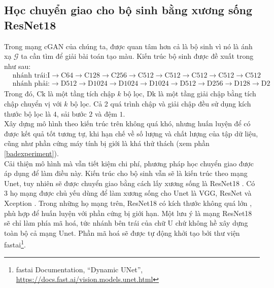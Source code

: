\documentclass[a4paper, 12pt]{article}
\begin{document}
\subsection{Học chuyển giao cho bộ sinh bằng xương sống ResNet18}\label{transferlearning}
Trong mạng cGAN của chúng ta, được quan tâm hơn cả là bộ sinh vì nó là ánh xạ $\mathcal{G}$ ta cần tìm để giải bài toán tạo màu. Kiến trúc bộ sinh được đề xuất trong \cite{isola2018imagetoimage} như sau:
\begin{align*}
    &\text{nhánh trái:} \text{I} \rightarrow \text{C64} \rightarrow \text{C128} \rightarrow \text{C256} \rightarrow \text{C512} \rightarrow \text{C512} \rightarrow \text{C512} \rightarrow \text{C512} \rightarrow \text{C512}\\
    &\text{nhánh phải:} \rightarrow \text{D512} \rightarrow \text{D1024} \rightarrow \text{D1024} \rightarrow \text{D1024} \rightarrow \text{D512} \rightarrow \text{D256} \rightarrow \text{D128} \rightarrow \text{D2}
\end{align*}
Trong đó, $\text{Ck}$ là một tầng tích chập $k$ bộ lọc, $\text{Dk}$ là một tầng giải chập bằng tích chập chuyển vị với $k$ bộ lọc. Cả 2 quá trình chập và giải chập đều sử dụng kích thước bộ lọc là $4$, sải bước $2$ và đệm $1$.\vspace{5pt}\\
Xây dựng mô hình theo kiến trúc trên không quá khó, nhưng huấn luyện để có được kết quả tốt tương tự, khi hạn chế về số lượng và chất lượng của tập dữ liệu, cũng như phần cứng máy tính bị giới là khá thử thách (xem phần \ref{badexperiment}).\vspace{5pt}\\
Cải thiện mô hình mà vẫn tiết kiệm chi phí, phương pháp học chuyển giao được áp dụng để làm điều này. Kiến trúc cho bộ sinh vẫn sẽ là kiến trúc theo mạng Unet, tuy nhiên sẽ được chuyển giao bằng cách lấy xương sống là ResNet18 \cite{christopherresunet2019}. Có 3 họ mạng được chủ yếu dùng để làm xương sống cho Unet là VGG, ResNet và Xception \cite{backboneresnet2020}. Trong những họ mạng trên, ResNet18 có kích thước không quá lớn \cite{Khan_2020}, phù hợp để huấn luyện với phần cứng bị giới hạn. Một lưu ý là mạng ResNet18 sẽ chỉ làm phía mã hoá, tức nhánh bên trái của chữ U chứ không hề xây dựng toàn bộ cả mạng Unet. Phần mã hoá sẽ được tự động khởi tạo bởi thư viện fastai\footnote{fastai Documentation, ``Dynamic UNet'', \href{https://docs.fast.ai/vision.models.unet.html}{https://docs.fast.ai/vision.models.unet.html}}.

\end{document}
